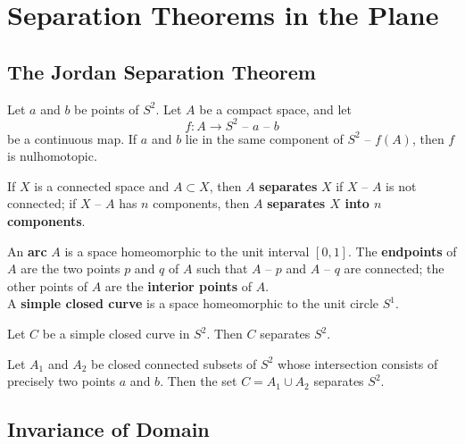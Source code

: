 \newpage

\section{Separation Theorems in the Plane}

\setcounter{subsection}{60}

\subsection{The Jordan Separation Theorem}

\begin{lemma}
Let $a$ and $b$ be points of $S^2$. Let $A$ be a compact space, and let
\[
    f\colon A \rightarrow S^2 \text{ -- } a \text{ -- } b
\]
be a continuous map. If $a$ and $b$ lie in the same component of $S^2 \text{ -- } f(A)$, then $f$ is nulhomotopic.
\end{lemma}

\begin{definition}
If $X$ is a connected space and $A \subset X$, then $A$ \textbf{separates} $X$ if $X \text{ -- } A$ is not connected;
if  $X \text{ -- } A$ has $n$ components, then $A$ \textbf{separates $X$ into $n$ components}.
\end{definition}

\begin{definition}
An \textbf{arc} $A$ is a space homeomorphic to the unit interval $[0, 1]$. The \textbf{endpoints} of $A$ are the two points $p$ and $q$ of $A$
such that $A \text{ -- } p$ and $A \text{ -- } q$ are connected; the other points of $A$ are the \textbf{interior points} of $A$. \\

A \textbf{simple closed curve} is a space homeomorphic to the unit circle $S^1$.
\end{definition}

\begin{theorem}
Let $C$ be a simple closed curve in $S^2$. Then $C$ separates $S^2$.
\end{theorem}

\begin{theorem}
Let $A_1$ and $A_2$ be closed connected subsets of $S^2$ whose intersection consists of precisely two points $a$ and $b$. Then the set
$C = A_1 \cup A_2$ separates $S^2$.
\end{theorem}


\subsection{Invariance of Domain}

